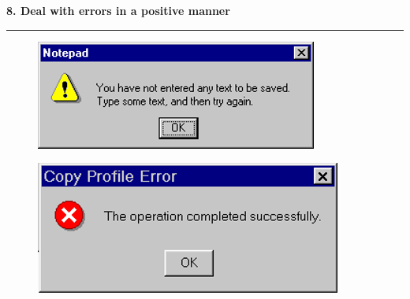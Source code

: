 \documentclass[pdf]{beamer}
\begin{document}
\begin{frame}
{\textbf{8. Deal with errors in a positive manner}}{\textcolor{red}{\rule{12cm}{1.2pt}}}

\begin{figure}[H]  
    \includegraphics[scale=0.7]{46_Picture6.png} 
\end{figure}

\begin{figure}[H]  
    \includegraphics[scale=0.7]{46_Picture7.png} 
\end{figure}

\end{frame}
\end{document}
